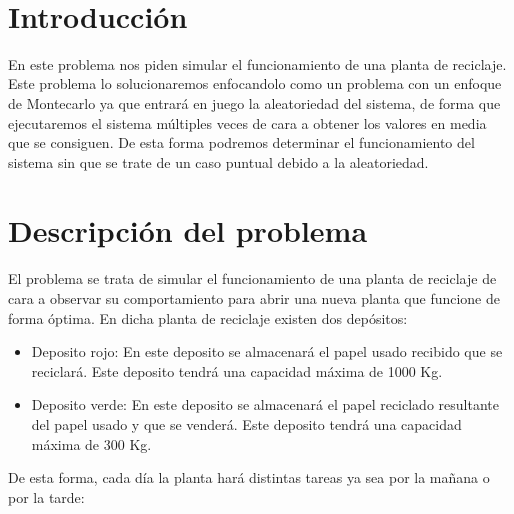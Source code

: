 \documentclass[12pt, spanish]{article}
\makeatletter
\let\thedate\@date
\makeatother
\begin{document}
\begin{titlepage}
    {\large \thedate}\\[0.5cm]
    {\doclicenseThis}

    \vfill

\end{titlepage}


\tableofcontents
\pagebreak



\section*{Introducción}

En este problema nos piden simular el funcionamiento de una planta de reciclaje. Este problema lo solucionaremos enfocandolo como un problema con un enfoque de Montecarlo ya que entrará en juego la aleatoriedad del sistema, de forma que ejecutaremos el sistema múltiples veces de cara a obtener los valores en media que se consiguen. De esta forma podremos determinar el funcionamiento del sistema sin que se trate de un caso puntual debido a la aleatoriedad.

\section{Descripción del problema}

El problema se trata de simular el funcionamiento de una planta de reciclaje de cara a observar su comportamiento para abrir una nueva planta que funcione de forma óptima. En dicha planta de reciclaje existen dos depósitos:

\begin{itemize}
	\item Deposito rojo: En este deposito se almacenará el papel usado recibido que se reciclará. Este deposito tendrá una capacidad máxima de 1000 Kg.
	\item Deposito verde: En este deposito se almacenará el papel reciclado resultante del papel usado y que se venderá. Este deposito tendrá una capacidad máxima de 300 Kg.
\end{itemize}

De esta forma, cada día la planta hará distintas tareas ya sea por la mañana o por la tarde:
\end{document}

